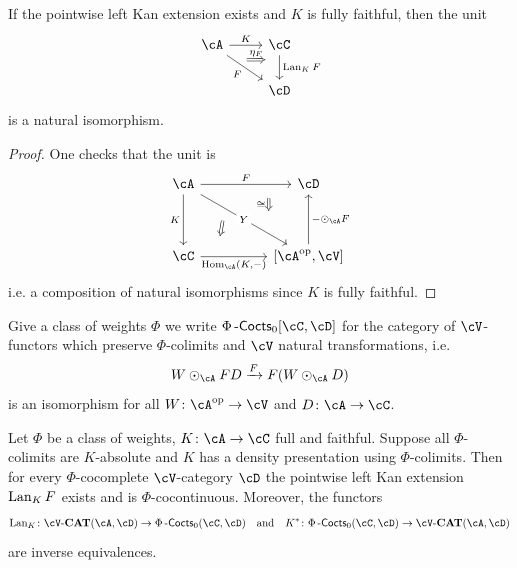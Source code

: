 \documentclass[a4paper,11pt,oneside,openany]{scrbook}
\begin{document}
\begin{lemma}
	If the pointwise left Kan extension exists and $ K $ is fully faithful, then
    the unit
	\begin{displaymath}
		\begin{tikzcd}
			\cA \arrow[r, "K"]\arrow[rd,"F"', 	""{name=F,marking,near start}] 	 &
			\cC \arrow[d, "{\Lan_K F}",		""{name=L,marking,above, near start}]	\\
			& \cD
			\arrow[Rightarrow, from=F, to=L, shorten <=10pt, shorten >=10pt, start anchor={north west}, end anchor={[yshift=1pt]}, "\eta_F"]
		\end{tikzcd}
	\end{displaymath}
    is a natural isomorphism.
\end{lemma}
\begin{proof}
	One checks that the unit is
	\begin{displaymath}
		\begin{tikzcd}[column sep = huge, row sep =huge]
			\cA
			\arrow[r,"F", ""{name=F, near end}]
			\arrow[d,"K"']
			\arrow[rd, "Y"description, ""{name=Y, near end}, ""{name=Z, near start}]
			&
			\cD
			\\
			\cC
			\arrow[r, "{\Hom_{\cA}(K,-)}"', ""{name=H, near start}]
			&
			\lbrack\cA^{\op},\cV\rbrack
			\arrow[u, "-\odot_\cA F"']
			\arrow[Rightarrow, from =F, to=Y, shorten <= 10pt, shorten >=10pt, "\iso"']
			\arrow[Rightarrow, from =Z, to=H, shorten <= 10pt, shorten >=10pt]
		\end{tikzcd}
	\end{displaymath}
	i.e. a composition of natural isomorphisms since $ K $ is fully faithful.
\end{proof}
\begin{defn}
	Give a class of weights $ \Phi $ we write $ \Phi\Cocts_0[\cC,\cD] $ for the
    category of $ \cV $-functors which preserve $ \Phi $-colimits and $ \cV $
    natural transformations, i.e.
	\begin{displaymath}
		W\odot _\cA FD \xrightarrow{F}  F(W\odot_\cA D)
	\end{displaymath}
	is an isomorphism for all $ W \from \cA ^{\op} \to \cV $ and $ D \from \cA
    \to \cC $.
\end{defn}
\begin{thm}
	Let $ \Phi $ be a class of weights, $ K \from \cA \to \cC $ full and faithful.
	Suppose all $ \Phi $-colimits are $ K $-absolute and $ K $ has a density presentation using $ \Phi $-colimits.
	Then for every $ \Phi $-cocomplete $ \cV $-category $ \cD $ the pointwise left Kan extension $ \operatorname{Lan}_K F $ exists and is $ \Phi $-cocontinuous.
	Moreover, the functors
	\begin{displaymath}
		\Lan_K \from \cV\text{-}\CAT(\cA,\cD) \to \Phi\Cocts_0(\cC,\cD) \quad \text{and} \quad K^*\from \Phi\Cocts_0(\cC,\cD) \to \cV\text{-}\CAT(\cA,\cD)
	\end{displaymath}
	are inverse equivalences.
\end{thm}
\end{document}
